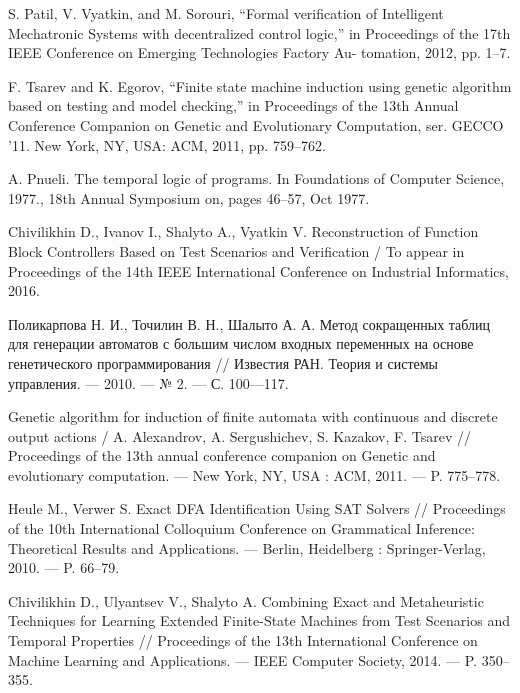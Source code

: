 \documentclass[14pt]{extarticle}
\theoremstyle{plain}
\theoremstyle{definition}
\begin{document}
\begin{thebibliography}{99}
S. Patil, V. Vyatkin, and M. Sorouri, “Formal verification of Intelligent
Mechatronic Systems with decentralized control logic,” in Proceedings
of the 17th IEEE Conference on Emerging Technologies Factory Au-
tomation, 2012, pp. 1–7.

F. Tsarev and K. Egorov, “Finite state machine induction using genetic
algorithm based on testing and model checking,” in Proceedings of
the 13th Annual Conference Companion on Genetic and Evolutionary
Computation, ser. GECCO ’11. New York, NY, USA: ACM, 2011, pp.
759–762.

A. Pnueli. The temporal logic of programs.
In Foundations of Computer Science, 1977., 18th Annual Symposium on, pages 46–57, Oct 1977.

Chivilikhin D., Ivanov I., Shalyto A., Vyatkin V. Reconstruction of Function Block
Controllers Based on Test Scenarios and Verification / To appear in Proceedings of
the 14th IEEE International Conference on Industrial Informatics, 2016.

Поликарпова Н. И., Точилин В. Н., Шалыто А. А.
Метод сокращенных таблиц для генерации автоматов с большим числом входных
переменных на основе генетического программирования // Известия РАН.
Теория и системы управления. — 2010. — № 2. — С. 100—117.

Genetic algorithm for induction of finite automata with continuous and
discrete output actions / A. Alexandrov, A. Sergushichev, S. Kazakov,
F. Tsarev // Proceedings of the 13th annual conference companion on
Genetic and evolutionary computation. — New York, NY, USA : ACM,
2011. — P. 775–778.

Heule M., Verwer S. Exact DFA Identification Using SAT Solvers // Proceedings
of the 10th International Colloquium Conference on Grammatical
Inference: Theoretical Results and Applications. — Berlin, Heidelberg
: Springer-Verlag, 2010. — P. 66–79.

Chivilikhin D., Ulyantsev V., Shalyto A. Combining Exact and Metaheuristic
Techniques for Learning Extended Finite-State Machines from
Test Scenarios and Temporal Properties // Proceedings of the 13th International
Conference on Machine Learning and Applications. — IEEE
Computer Society, 2014. — P. 350–355.

\end{thebibliography}
\end{document}
